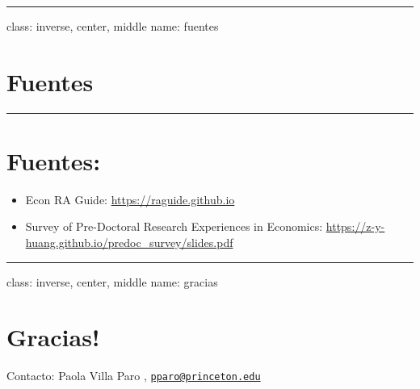 \documentclass[
]{article}
\begin{document}
\begin{center}\rule{0.5\linewidth}{0.5pt}\end{center}

class: inverse, center, middle name: fuentes

\hypertarget{fuentes}{%
\section{Fuentes}\label{fuentes}}

\begin{center}\rule{0.5\linewidth}{0.5pt}\end{center}

\hypertarget{fuentes-1}{%
\section{Fuentes:}\label{fuentes-1}}

\begin{itemize}
\item
  Econ RA Guide: \url{https://raguide.github.io}
\item
  Survey of Pre-Doctoral Research Experiences in Economics:
  \url{https://z-y-huang.github.io/predoc_survey/slides.pdf}
\end{itemize}

\begin{center}\rule{0.5\linewidth}{0.5pt}\end{center}

class: inverse, center, middle name: gracias

\hypertarget{gracias}{%
\section{Gracias!}\label{gracias}}

Contacto: Paola Villa Paro ,
\href{mailto:pparo@princeton.edu}{\nolinkurl{pparo@princeton.edu}}
\end{document}
